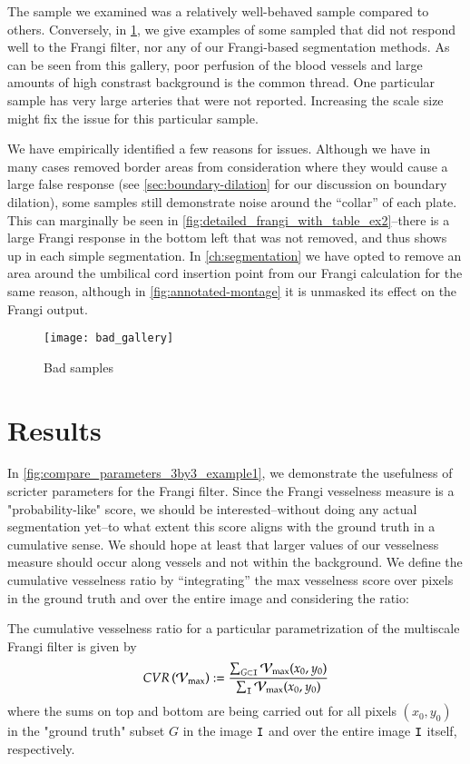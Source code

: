 The sample we examined was a relatively well-behaved sample compared to others. Conversely, in \cref{fig:bad-gallery}, we give examples of some sampled that did not respond well to the Frangi filter, nor any of our Frangi-based segmentation methods. As can be seen from this gallery, poor perfusion of the blood vessels and large amounts of high constrast background is the common thread. One particular sample has very large arteries that were not reported. Increasing the scale size might fix the issue for this particular sample.

We have empirically identified a few reasons for issues. Although we have in many cases removed border areas from consideration where they would cause a large false response (see \cref{sec:boundary-dilation} for our discussion on boundary dilation), some samples still demonstrate noise around the ``collar'' of each plate. This can marginally be seen in \cref{fig:detailed_frangi_with_table_ex2}--there is a large Frangi response in the bottom left that was not removed, and thus shows up in each simple segmentation.
In \cref{ch:segmentation} we have opted to remove an area around the umbilical cord insertion point from our Frangi calculation for the same reason, although in \cref{fig:annotated-montage} it is unmasked its effect on the Frangi output.

\begin{figure}[p]
	\texttt{[image: bad\_gallery]}
	\caption{Bad samples}
	\label{fig:bad-gallery}
\end{figure}

\section{Results}

In \cref{fig:compare_parameters_3by3_example1}, we demonstrate the usefulness of scricter parameters for the Frangi filter. Since the Frangi vesselness measure is a "probability-like" score, we should be interested--without doing any actual segmentation yet--to what extent this score aligns with the ground truth in a cumulative sense. We should hope at least that larger values of our vesselness measure should occur along vessels and not within the background. We define the cumulative vesselness ratio by ``integrating'' the max vesselness score over pixels in the ground truth and over the entire image and considering the ratio:

\begin{defn} The cumulative vesselness ratio for a particular parametrization of the multiscale Frangi filter is given by
	\begin{equation}
	CVR\left(\mathcal{V}_{\max}\right) := \frac{\sum_{G\subset\mathtt{I}} \mathcal{V}_{\max}(x_0, y_0)}{\sum_{\mathtt{I}} \mathcal{V}_{\max}(x_0,y_0)}
	\end{equation}
	where the sums on top and bottom are being carried out for all pixels $(x_0,y_0)$ in the "ground truth" subset $G$ in the image $\mathtt{I}$
	and over the entire image $\mathtt{I}$ itself, respectively.
\end{defn}

